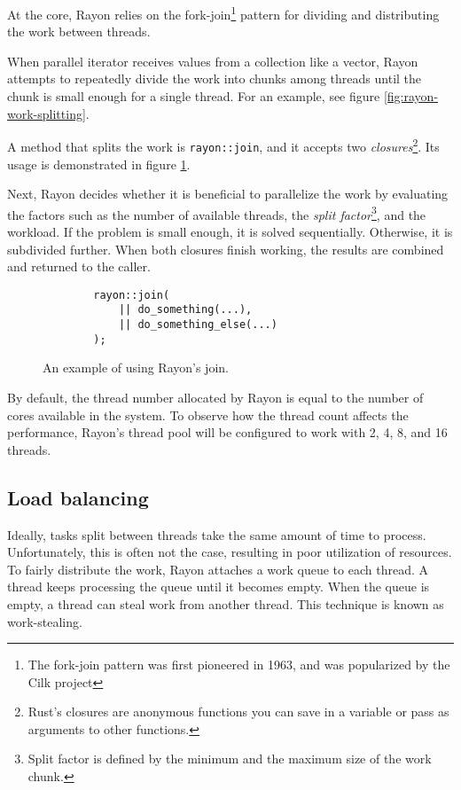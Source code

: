 At the core, Rayon relies on the fork-join\footnote{The fork-join pattern was first pioneered in 1963\cite{history-of-fork-join}, and was popularized by the Cilk project\cite{cilk}} pattern for dividing and distributing the work between threads.

When parallel iterator receives values from a collection like a vector, Rayon attempts to repeatedly divide the work into chunks among threads until the chunk is small enough for a single thread. For an example, see figure \ref{fig:rayon-work-splitting}.

A method that splits the work is \texttt{rayon::join}, and it accepts two \emph{closures}\footnote{Rust’s closures are anonymous functions you can save in a variable or pass as arguments to other functions.}. Its usage is demonstrated in figure \ref{fig:rayon-join}.

Next, Rayon decides whether it is beneficial to parallelize the work by evaluating the factors such as the number of available threads, the \emph{split factor}\footnote{Split factor is defined by the minimum and the maximum size of the work chunk.}, and the workload. If the problem is small enough, it is solved sequentially. Otherwise, it is subdivided further. When both closures finish working, the results are combined and returned to the caller.

\begin{figure}[!htbp]
    \centering

    \begin{verbatim}
        rayon::join(
            || do_something(...),
            || do_something_else(...)
        );
    \end{verbatim}

    \caption{An example of using Rayon's join.}
    \label{fig:rayon-join}
\end{figure}

By default, the thread number allocated by Rayon is equal to the number of cores available in the system. To observe how the thread count affects the performance, Rayon's thread pool will be configured to work with 2, 4, 8, and 16 threads.

\subsection{Load balancing}
Ideally, tasks split between threads take the same amount of time to process. Unfortunately, this is often not the case, resulting in poor utilization of resources. To fairly distribute the work, Rayon attaches a work queue to each thread. A thread keeps processing the queue until it becomes empty. When the queue is empty, a thread can steal work from another thread. This technique is known as work-stealing.

